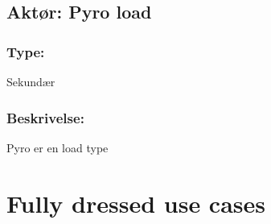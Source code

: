 \begin{framed}
	\subsection{Aktør: Pyro load}
	\subsubsection*{Type:}
	Sekundær
	
	\subsubsection*{Beskrivelse:}
	Pyro er en load type
\end{framed}

\clearpage


\section{Fully dressed use cases}


